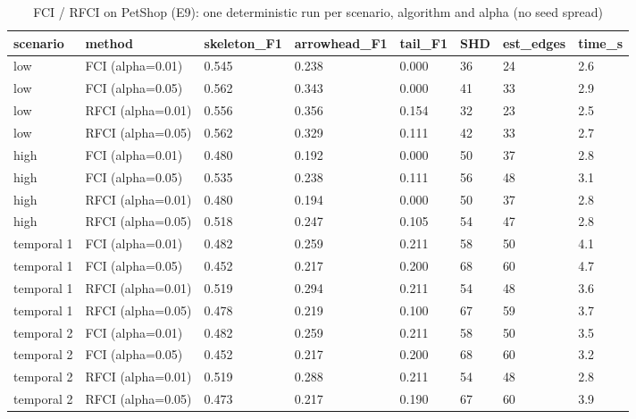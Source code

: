\begin{table}[t]
\centering\footnotesize
\caption{FCI / RFCI on PetShop (E9): one deterministic run per scenario, algorithm and alpha (no seed spread)}\label{tab:T2g_fci_petshop}
\begin{tabular}{@{}llllllll@{}}
\toprule
scenario & method & skeleton\_F1 & arrowhead\_F1 & tail\_F1 & SHD & est\_edges & time\_s\\
\midrule
low & FCI (alpha=0.01) & 0.545 & 0.238 & 0.000 & 36 & 24 & 2.6\\
low & FCI (alpha=0.05) & 0.562 & 0.343 & 0.000 & 41 & 33 & 2.9\\
low & RFCI (alpha=0.01) & 0.556 & 0.356 & 0.154 & 32 & 23 & 2.5\\
low & RFCI (alpha=0.05) & 0.562 & 0.329 & 0.111 & 42 & 33 & 2.7\\
high & FCI (alpha=0.01) & 0.480 & 0.192 & 0.000 & 50 & 37 & 2.8\\
high & FCI (alpha=0.05) & 0.535 & 0.238 & 0.111 & 56 & 48 & 3.1\\
high & RFCI (alpha=0.01) & 0.480 & 0.194 & 0.000 & 50 & 37 & 2.8\\
high & RFCI (alpha=0.05) & 0.518 & 0.247 & 0.105 & 54 & 47 & 2.8\\
temporal 1 & FCI (alpha=0.01) & 0.482 & 0.259 & 0.211 & 58 & 50 & 4.1\\
temporal 1 & FCI (alpha=0.05) & 0.452 & 0.217 & 0.200 & 68 & 60 & 4.7\\
temporal 1 & RFCI (alpha=0.01) & 0.519 & 0.294 & 0.211 & 54 & 48 & 3.6\\
temporal 1 & RFCI (alpha=0.05) & 0.478 & 0.219 & 0.100 & 67 & 59 & 3.7\\
temporal 2 & FCI (alpha=0.01) & 0.482 & 0.259 & 0.211 & 58 & 50 & 3.5\\
temporal 2 & FCI (alpha=0.05) & 0.452 & 0.217 & 0.200 & 68 & 60 & 3.2\\
temporal 2 & RFCI (alpha=0.01) & 0.519 & 0.288 & 0.211 & 54 & 48 & 2.8\\
temporal 2 & RFCI (alpha=0.05) & 0.473 & 0.217 & 0.190 & 67 & 60 & 3.9\\
\bottomrule
\end{tabular}
\end{table}
